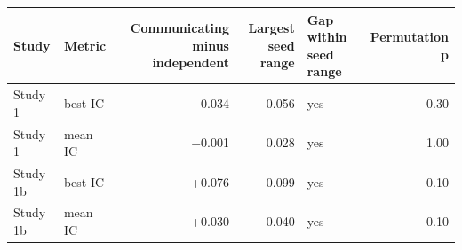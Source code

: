 \begin{tabular}{llrrlr}
\toprule
Study & Metric & Communicating minus independent & Largest seed range & Gap within seed range & Permutation p \\
\midrule
Study 1 & best IC & $-$0.034 & 0.056 & yes & 0.30 \\
Study 1 & mean IC & $-$0.001 & 0.028 & yes & 1.00 \\
Study 1b & best IC & +0.076 & 0.099 & yes & 0.10 \\
Study 1b & mean IC & +0.030 & 0.040 & yes & 0.10 \\
\bottomrule
\end{tabular}
